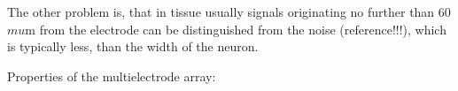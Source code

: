 \documentclass[12pt,a4paper]{article}
\begin{document}
 The other problem is, that in tissue usually signals originating no further than 60 $mu$m from the electrode can be distinguished from the noise (reference!!!), which is typically  less, than the width of the neuron.

Properties of the multielectrode array:



 



\end{document}

